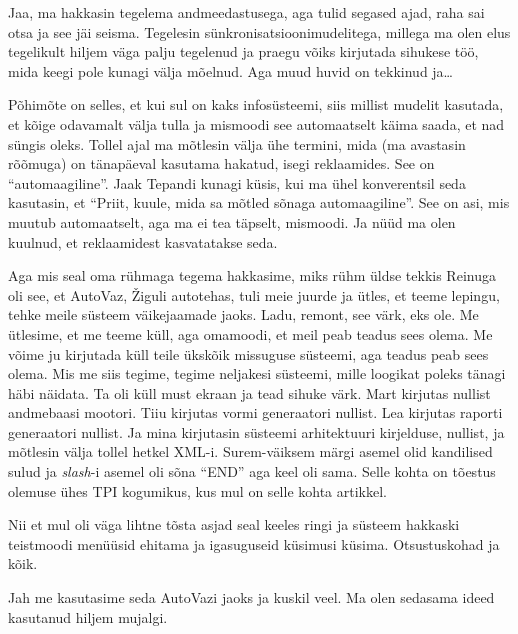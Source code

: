 
Jaa, ma hakkasin tegelema andmeedastusega, aga tulid segased ajad, raha sai otsa ja see jäi seisma. Tegelesin sünkronisatsioonimudelitega, millega ma olen elus tegelikult hiljem väga palju tegelenud ja praegu võiks kirjutada sihukese töö, mida keegi pole kunagi välja mõelnud. Aga muud huvid on tekkinud ja\ldots 


Põhimõte on selles, et kui sul on kaks infosüsteemi, siis millist mudelit kasutada, et kõige odavamalt välja tulla ja mismoodi see automaatselt käima saada, et nad süngis oleks. Tollel ajal ma mõtlesin välja ühe termini, mida (ma avastasin rõõmuga) on  tänapäeval  kasutama hakatud, isegi reklaamides. See on \enquote{automaagiline}. Jaak Tepandi kunagi küsis, kui ma ühel konverentsil seda kasutasin, et \enquote{Priit, kuule, mida sa mõtled sõnaga automaagiline}. See on asi, mis muutub automaatselt, aga ma ei tea täpselt, mismoodi. Ja nüüd ma olen kuulnud, et reklaamidest kasvatatakse seda. 

Aga mis seal oma rühmaga tegema hakkasime, miks rühm üldse tekkis Reinuga oli see, et AutoVaz, Žiguli autotehas, tuli meie juurde ja ütles, et teeme lepingu, tehke meile süsteem väikejaamade jaoks. Ladu, remont, see värk, eks ole. Me ütlesime, et me teeme küll, aga omamoodi, et meil peab teadus sees olema. Me võime ju kirjutada küll teile ükskõik missuguse süsteemi, aga teadus peab sees olema. Mis me siis tegime, tegime neljakesi süsteemi, mille loogikat poleks tänagi häbi näidata. Ta oli küll must ekraan ja tead sihuke värk. Mart kirjutas nullist andmebaasi mootori. Tiiu kirjutas vormi generaatori nullist. Lea kirjutas raporti generaatori nullist. Ja mina kirjutasin süsteemi arhitektuuri kirjelduse,  nullist, ja mõtlesin välja tollel hetkel XML-i. Surem-väiksem märgi asemel olid kandilised sulud ja \emph{slash}-i asemel oli sõna \enquote{END} aga keel oli sama. Selle kohta on tõestus olemuse ühes TPI kogumikus, kus mul on selle kohta artikkel. 

Nii et mul oli väga lihtne tõsta asjad seal keeles ringi ja süsteem hakkaski teistmoodi menüüsid ehitama ja igasuguseid küsimusi küsima. Otsustuskohad ja kõik.


Jah me kasutasime seda AutoVazi jaoks ja  kuskil veel. Ma olen sedasama ideed kasutanud hiljem mujalgi.

